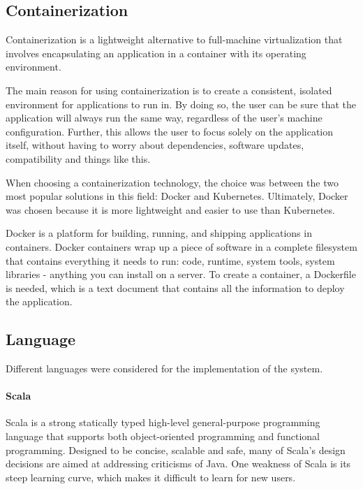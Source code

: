 \documentclass[12pt,a4paper,openright,twoside]{book}
\begin{document}
\subsection{Containerization}

Containerization is a lightweight alternative to full-machine virtualization that involves encapsulating an application in a container with its operating environment.

The main reason for using containerization is to create a consistent, isolated environment for applications to run in.
By doing so, the user can be sure that the application will always run the same way, regardless of the user's machine configuration. 
Further, this allows the user to focus solely on the application itself, without having to worry about dependencies, software updates, compatibility and things like this.

When choosing a containerization technology, the choice was between the two most popular solutions in this field: Docker and Kubernetes.
Ultimately, Docker was chosen because it is more lightweight and easier to use than Kubernetes.

Docker is a platform for building, running, and shipping applications in containers.
Docker containers wrap up a piece of software in a complete filesystem that contains everything it needs to run:
code, runtime, system tools, system libraries - anything you can install on a server.
To create a container, a Dockerfile is needed, which is a text document that contains all the information to deploy the application.

\subsection{Language}
Different languages were considered for the implementation of the system.

\paragraph*{Scala}
Scala is a strong statically typed high-level general-purpose programming language that supports both object-oriented 
programming and functional programming. 
Designed to be concise, scalable and safe, many of Scala's design decisions are aimed at addressing criticisms of Java.
\cite{enwiki:1179700699}
One weakness of Scala is its steep learning curve, which makes it difficult to learn for new users.
\end{document}
